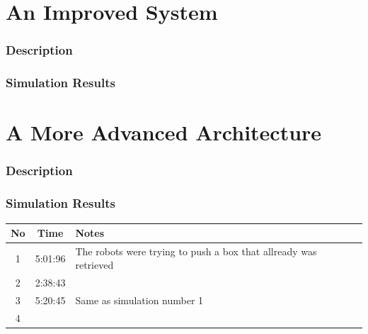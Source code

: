 \documentclass[a4paper]{article}
\begin{document}
\part{An Improved System}

\section{Description}



\section{Simulation Results}
\part{A More Advanced Architecture}

\section{Description}
\newpage
\section{Simulation Results}
\begin{table}[H]
\centering
\begin{tabular}{ c | c | p{5cm}}
\hline No & Time & Notes \\ \hline

1 & 5:01:96 & The robots were trying to push a box that allready was retrieved \\ \hline
2 & 2:38:43 & \\ \hline
3 & 5:20:45 & Same as simulation number 1 \\ \hline
4


\end{tabular}
\end{table}




\newpage
\end{document}
